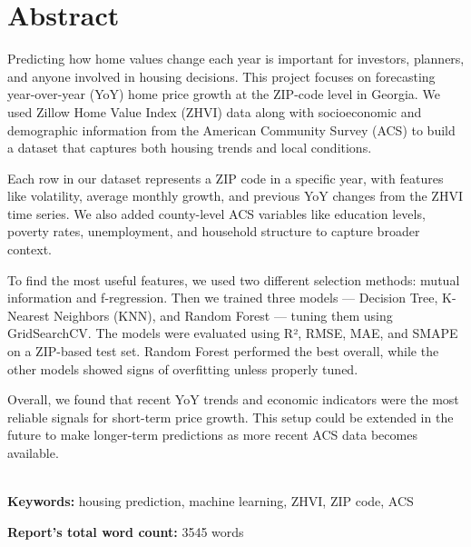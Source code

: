 \chapter*{\center \Large  Abstract}

Predicting how home values change each year is important for investors, planners, and anyone involved in housing decisions. This project focuses on forecasting year-over-year (YoY) home price growth at the ZIP-code level in Georgia. We used Zillow Home Value Index (ZHVI) data along with socioeconomic and demographic information from the American Community Survey (ACS) to build a dataset that captures both housing trends and local conditions.

Each row in our dataset represents a ZIP code in a specific year, with features like volatility, average monthly growth, and previous YoY changes from the ZHVI time series. We also added county-level ACS variables like education levels, poverty rates, unemployment, and household structure to capture broader context.

To find the most useful features, we used two different selection methods: mutual information and f-regression. Then we trained three models — Decision Tree, K-Nearest Neighbors (KNN), and Random Forest — tuning them using GridSearchCV. The models were evaluated using R², RMSE, MAE, and SMAPE on a ZIP-based test set. Random Forest performed the best overall, while the other models showed signs of overfitting unless properly tuned.

Overall, we found that recent YoY trends and economic indicators were the most reliable signals for short-term price growth. This setup could be extended in the future to make longer-term predictions as more recent ACS data becomes available.

~\\[1cm]
\noindent\textbf{Keywords:} housing prediction, machine learning, ZHVI, ZIP code, ACS

\vfill
\noindent
\textbf{Report's total word count:} 3545 words





